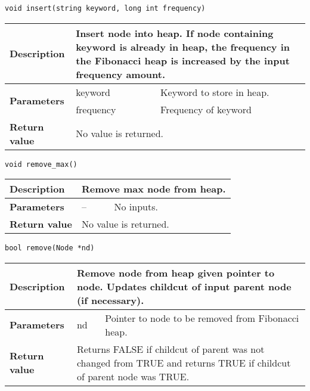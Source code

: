 \documentclass[12pt, reqno]{amsart}
\begin{document}
{\large \texttt{void insert(string keyword, long int frequency)}}
\begin{center}
    \begin{tabular}{| l | p{2.5cm} | p{9.5cm} |}
    \hline
    {\bfseries Description} & \multicolumn{2}{p{12.5cm}|}{Insert node into heap. If node containing keyword is already in heap, the frequency in the Fibonacci heap is increased by the input frequency amount.} \\ \hline
    \multirow{2}{*}{\bfseries Parameters} & keyword & Keyword to store in heap. \\ \cline{2-3}
    & frequency & Frequency of keyword \\ \hline
    {\bfseries Return value} & \multicolumn{2}{p{12.5cm}|}{No value is returned.} \\ \hline
    \end{tabular}
\end{center}
\vspace{3mm}   
    
{\large \texttt{void remove\_max()}}
\begin{center}
    \begin{tabular}{| l | p{2.5cm} | p{9.5cm} |}
    \hline
    {\bfseries Description} & \multicolumn{2}{p{12.5cm}|}{Remove max node from heap.} \\ \hline
    \multirow{1}{*}{\bfseries Parameters} & -- & No inputs. \\ \hline
    {\bfseries Return value} & \multicolumn{2}{p{12.5cm}|}{No value is returned.} \\ \hline
    \end{tabular}
\end{center}
\vspace{3mm}   

{\large \texttt{bool remove(Node *nd)}}
\begin{center}
    \begin{tabular}{| l | p{2.5cm} | p{9.5cm} |}
    \hline
    {\bfseries Description} & \multicolumn{2}{p{12.5cm}|}{Remove node from heap given pointer to node. Updates childcut of input parent node (if necessary).} \\ \hline
    \multirow{1}{*}{\bfseries Parameters} & nd & Pointer to node to be removed from Fibonacci heap. \\ \hline
    {\bfseries Return value} & \multicolumn{2}{p{12.5cm}|}{Returns FALSE if childcut of parent was not changed from TRUE and returns TRUE if childcut of parent node was TRUE.} \\ \hline
    \end{tabular}
\end{center}
\vspace{3mm}   
    
\end{document}

